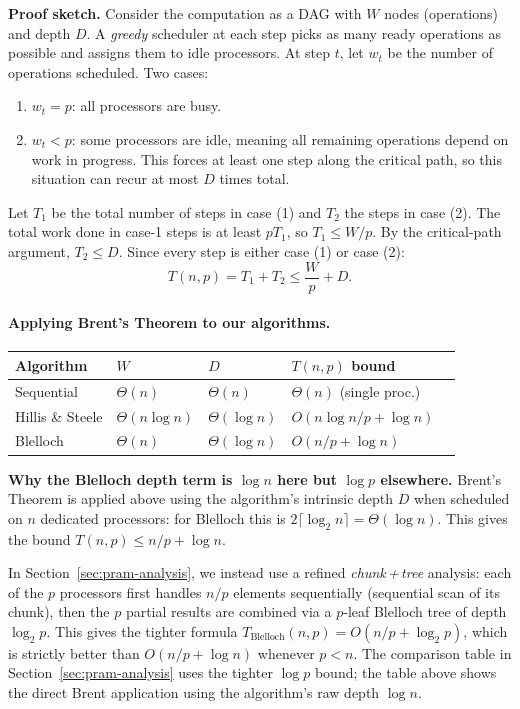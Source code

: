 \noindent\textbf{Proof sketch.} Consider the computation as a DAG with $W$
nodes (operations) and depth $D$. A \emph{greedy} scheduler at each step
picks as many ready operations as possible and assigns them to idle
processors. At step $t$, let $w_t$ be the number of operations scheduled.
Two cases:
\begin{enumerate}[leftmargin=*]
  \item $w_t = p$: all processors are busy.
  \item $w_t < p$: some processors are idle, meaning all remaining
        operations depend on work in progress. This forces at least one
        step along the critical path, so this situation can recur at most
        $D$ times total.
\end{enumerate}
Let $T_1$ be the total number of steps in case (1) and $T_2$ the steps in
case (2). The total work done in case-1 steps is at least $p T_1$, so
$T_1 \le W / p$. By the critical-path argument, $T_2 \le D$. Since every
step is either case (1) or case (2):
\[
T(n,p) = T_1 + T_2 \le \frac{W}{p} + D.
\]

\paragraph{Applying Brent's Theorem to our algorithms.}
\begin{center}
\begin{tabular}{lllll}
\toprule
\textbf{Algorithm} & $W$ & $D$ & $T(n,p)$ bound \\
\midrule
Sequential         & $\Theta(n)$         & $\Theta(n)$ & $\Theta(n)$ (single proc.) \\
Hillis \& Steele   & $\Theta(n \log n)$  & $\Theta(\log n)$
                   & $O(n \log n / p + \log n)$ \\
Blelloch           & $\Theta(n)$         & $\Theta(\log n)$
                   & $O(n/p + \log n)$ \\
\bottomrule
\end{tabular}
\end{center}

\begin{ppnote}
\textbf{Why the Blelloch depth term is $\log n$ here but $\log p$ elsewhere.}
Brent's Theorem is applied above using the algorithm's intrinsic depth $D$
when scheduled on $n$ dedicated processors: for Blelloch this is
$2\lceil\log_2 n\rceil = \Theta(\log n)$. This gives the bound
$T(n,p) \le n/p + \log n$.

In Section~\ref{sec:pram-analysis}, we instead use a refined
\emph{chunk\,+\,tree} analysis: each of the $p$ processors first
handles $n/p$ elements sequentially (sequential scan of its chunk),
then the $p$ partial results are combined via a $p$-leaf Blelloch tree
of depth $\log_2 p$. This gives the tighter formula
$T_{\mathrm{Blelloch}}(n,p) = O(n/p + \log_2 p)$, which is strictly
better than $O(n/p + \log n)$ whenever $p < n$. The comparison table
in Section~\ref{sec:pram-analysis} uses the tighter $\log p$ bound;
the table above shows the direct Brent application using the algorithm's
raw depth $\log n$.
\end{ppnote}

